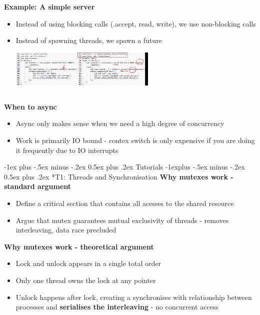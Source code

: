 \documentclass[10pt, landscape]{article}
\makeatletter
\renewcommand{\section}{\@startsection{section}{1}{0mm}%
                                {-1ex plus -.5ex minus -.2ex}%
                                {0.5ex plus .2ex}%
                                {\normalfont\large\bfseries}}
\renewcommand{\subsection}{\@startsection{subsection}{2}{0mm}%
                                {-1explus -.5ex minus -.2ex}%
                                {0.5ex plus .2ex}%
                                {\normalfont\normalsize\bfseries}}
\makeatother
\begin{document}
\begin{multicols}{4}
\textbf{Example: A simple server} \\
\begin{itemize}
    \item Instead of using blocking calls (.accept, read, write), we use non-blocking calls
    \item Instead of spawning threads, we spawn a future 
    \includegraphics*[width=7cm, height=2.5cm]{simpleserver.png}
\end{itemize}

\textbf{When to async} \\
\begin{itemize}
    \item Async only makes sense when we need a high degree of concurrency 
    \item Work is primarily IO bound - contex switch is only expensive if you are doing it frequently due to IO interrupts
\end{itemize}
\pagebreak
\section{Tutorials}
\subsection*{T1: Threads and Synchronisation}
\textbf{Why mutexes work - standard argument}\\ 
\begin{itemize}
    \item Define a critical section that contains all acesses to the shared resource 
    \item Argue that mutex guarantees mutual exclusivity of threads - removes interleaving, data race precluded
\end{itemize}

\textbf{Why mutexes work - theoretical argument}\\
\begin{itemize}
    \item Lock and unlock appears in a single total order
    \item Only one thread owns the lock at any pointer
    \item Unlock happens after lock, creating a synchronises with relationship between processes and \textbf{serialises the interleaving} - no concurrent access
\end{itemize}



\end{multicols}
\end{document}
